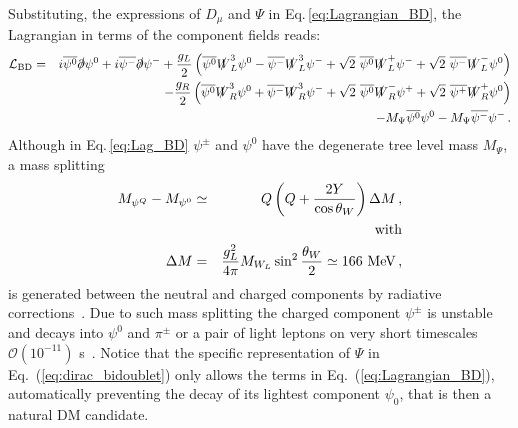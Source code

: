\documentclass[11pt]{article}
\begin{document}
Substituting, the expressions of $D_{\mu}$ and
$\Psi$ in Eq.\,\eqref{eq:Lagrangian_BD}, the Lagrangian
in terms of the component fields reads:
\begin{eqnarray}
\mathcal{L}_{\rm BD} &=& 
i\overline{\psi^0} \slashed{\partial} \psi^0 +
i\overline{\psi^{-}} \slashed{\partial} \psi^{-}+
\dfrac{g_L}{2}\left(\overline{\psi^0}\slashed{W}^3_L{\psi^0}
-\overline{\psi^{-}}\slashed{W}^3_L{\psi^{-}}
+\sqrt{2}\,\,\overline{\psi^0}\slashed{W}^{+}_L\psi^{-}
+\sqrt{2}\,\,\overline{\psi^-}\slashed{W}^{-}_L\psi^{0}\right) \nonumber \\
&&~~~~~-\dfrac{g_R}{2} \left(\overline{\psi^0}\slashed{W}^3_R{\psi^0}
+\overline{\psi^{-}}\slashed{W}^3_R{\psi^{-}}
+\sqrt{2}\,\,\overline{\psi^0}{\slashed{W}^{-}_R}\psi^{+}
+\sqrt{2}\,\,\overline{\psi^{+}}{\slashed{W}^{+}_R}\psi^{0}
\right)\nonumber\\
&&~~~~~-M_{\Psi} \overline{\psi^0}\psi^0
-M_{\Psi} \overline{\psi^{-}}\psi^{-}\,.
\label{eq:Lag_BD}
\end{eqnarray}
Although in Eq.\,\eqref{eq:Lag_BD} $\psi^{\pm}$ and $\psi^0$ have the degenerate tree level mass $M_{\Psi}$, a mass splitting
\begin{eqnarray}
M_{\psi^Q}-M_{\psi^0} &\simeq& Q\left(Q+\dfrac{2Y}{\cos\theta_W}
\right)\Delta{M}\,,
\label{eq:DeltaM}\\
&&\hspace{-6cm}{\rm with} \nonumber \\
\Delta{M} &=& \dfrac{g^2_L}{4\pi} M_{W_L} \sin^2 \frac{\theta_W}{2}
\simeq 166\,\,{\rm MeV}\,, \nonumber
\end{eqnarray}
\noindent is generated between the neutral and charged components by radiative corrections~\cite{Cirelli:2005uq}. Due to such mass splitting the charged component $\psi^\pm$ is unstable and decays
into $\psi^{0}$ and $\pi^\pm$ or a pair of light leptons on very short timescales $\mathcal{O}(10^{-11})$ s~\cite{Garcia-Cely_LR_pheno}. Notice that the specific representation of $\Psi$ in Eq.~(\ref{eq:dirac_bidoublet}) only allows the terms in Eq.~(\ref{eq:Lagrangian_BD}), automatically preventing the decay of its lightest component $\psi_0$, that is then a natural DM candidate. 
\end{document}
